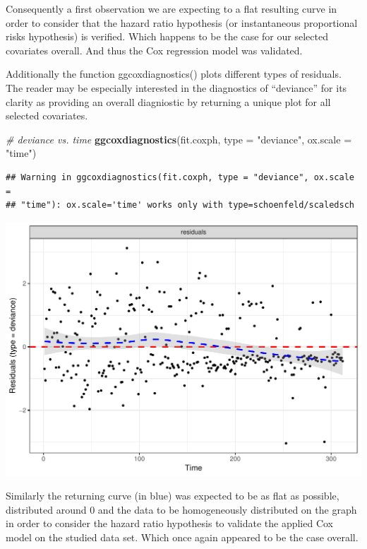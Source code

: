 \documentclass[]{article}
\newenvironment{Shaded}{\begin{snugshade}}{\end{snugshade}}
\newcommand{\KeywordTok}[1]{\textcolor[rgb]{0.13,0.29,0.53}{\textbf{#1}}}
\newcommand{\DataTypeTok}[1]{\textcolor[rgb]{0.13,0.29,0.53}{#1}}
\newcommand{\StringTok}[1]{\textcolor[rgb]{0.31,0.60,0.02}{#1}}
\newcommand{\CommentTok}[1]{\textcolor[rgb]{0.56,0.35,0.01}{\textit{#1}}}
\newcommand{\NormalTok}[1]{#1}
\begin{document}
Consequently a first observation we are expecting to a flat resulting
curve in order to consider that the hazard ratio hypothesis (or
instantaneous proportional risks hypothesis) is verified. Which happens
to be the case for our selected covariates overall. And thus the Cox
regression model was validated.

Additionally the function ggcoxdiagnostics() plots different types of
residuals. The reader may be especially interested in the diagnostics of
``deviance'' for its clarity as providing an overall diagniostic by
returning a unique plot for all selected covariates.

\begin{Shaded}
\begin{Highlighting}[]
\CommentTok{# deviance vs. time}
\KeywordTok{ggcoxdiagnostics}\NormalTok{(fit.coxph, }\DataTypeTok{type =} \StringTok{"deviance"}\NormalTok{, }\DataTypeTok{ox.scale =} \StringTok{"time"}\NormalTok{)}
\end{Highlighting}
\end{Shaded}

\begin{verbatim}
## Warning in ggcoxdiagnostics(fit.coxph, type = "deviance", ox.scale =
## "time"): ox.scale='time' works only with type=schoenfeld/scaledsch
\end{verbatim}

\includegraphics{survival_v5_files/figure-latex/unnamed-chunk-38-1.pdf}

Similarly the returning curve (in blue) was expected to be as flat as
possible, distributed around 0 and the data to be homogeneously
distributed on the graph in order to consider the hazard ratio
hypothesis to validate the applied Cox model on the studied data set.
Which once again appeared to be the case overall.
\end{document}

